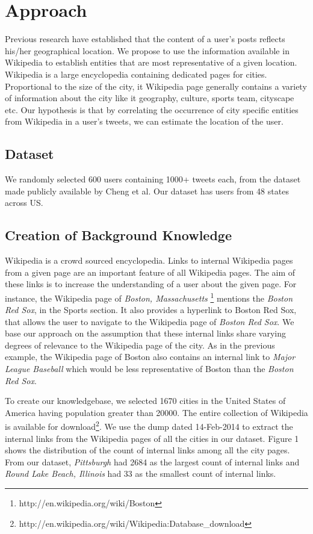  
\section{Approach}
\label{sec:approach}
Previous research \cite{cheng2010you} \cite{bo2012geolocation} have established that the content of a user's posts reflects his/her geographical location. We propose to use the information available in Wikipedia to establish entities that are most representative of a given location. Wikipedia is a large encyclopedia containing dedicated pages for cities. Proportional to the size of the city, it Wikipedia page generally contains a variety of information about the city like it geography, culture, sports team, cityscape etc. Our hypothesis is that by correlating the occurrence of city specific entities from Wikipedia in a user's tweets, we can estimate the location of the user.

\subsection{Dataset}
We randomly selected 600 users containing 1000+ tweets each, from the dataset made publicly available by Cheng et al\cite{cheng2010you}. Our dataset has users from 48 states across US. 

\subsection{Creation of Background Knowledge}
Wikipedia is a crowd sourced encyclopedia. Links to internal Wikipedia pages from a given page are an important feature of all Wikipedia pages. The aim of these links is to increase the understanding of a user about the given page. For instance, the Wikipedia page of \textit{Boston, Massachusetts} \footnote{http://en.wikipedia.org/wiki/Boston} mentions the \textit{Boston Red Sox}, in the Sports section. It also provides a hyperlink to Boston Red Sox, that allows the user to navigate to the Wikipedia page of \textit{Boston Red Sox}. We base our approach on the assumption that these internal links share varying degrees of relevance to the Wikipedia page of the city. As in the previous example, the Wikipedia page of Boston also contains an internal link to \textit{Major League Baseball} which would be less representative of Boston than the \textit{Boston Red Sox}. 

To create our knowledgebase, we selected 1670 cities in the United States of America having population greater than 20000. The entire collection of Wikipedia is available for download\footnote{http://en.wikipedia.org/wiki/Wikipedia:Database\_download}. We use the dump dated 14-Feb-2014 to extract the internal links from the Wikipedia pages of all the cities in our dataset. Figure 1 shows the distribution of the count of internal links among all the city pages. From our dataset, \textit{Pittsburgh} had 2684 as the largest count of internal links and \textit{Round Lake Beach, Illinois} had 33 as the smallest count of internal links.

